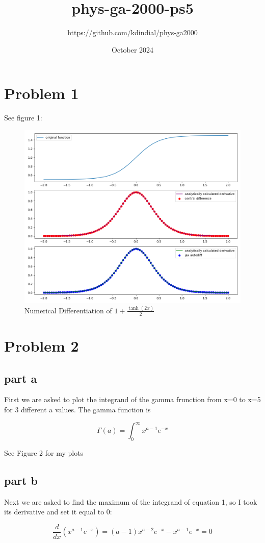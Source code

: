 \documentclass{article}
\title{phys-ga-2000-ps5}
\author{https://github.com/kdindial/phys-ga2000 }
\date{October 2024}
\begin{document}
\maketitle

\section{Problem 1}
See figure 1:
\begin{figure}[h!]
    \centering
    \includegraphics[width=0.5\linewidth]{ps5_figs/DifferentiationExample.png}
    \caption{Numerical Differentiation of $1+\frac{\tanh(2x)}{2}$}
    \label{fig:enter-label}
\end{figure}

\section{Problem 2}
\subsection{part a}

First we are asked to plot the integrand of the gamma frunction from x=0 to x=5 for 3 different a values. The gamma function is

\begin{equation}
    \Gamma(a)=\int_{0}^{\infty}x^{a-1}e^{-x}
\end{equation}

See Figure 2 for my plots

\subsection{part b}
Next we are asked to find the maximum of the integrand of equation 1, so I took its derivative and set it equal to 0:

\begin{equation}
    \frac{d}{dx}(x^{a-1}e^{-x})=(a-1)x^{a-2}e^{-x}-x^{a-1}e^{-x}=0
\end{equation}
\end{document}
